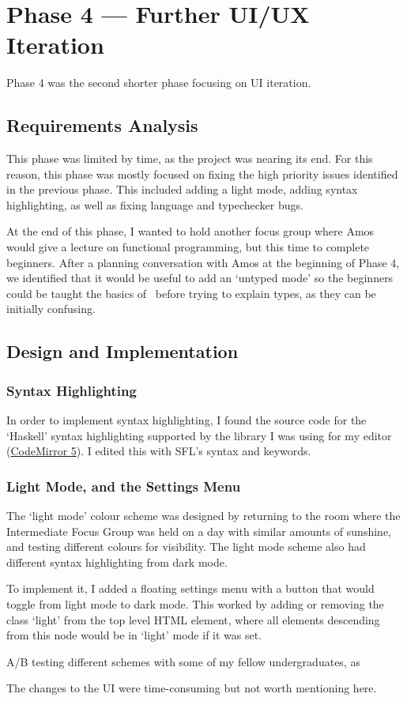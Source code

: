 \chapter{Phase 4 --- Further UI/UX Iteration}
Phase 4 was the second shorter phase focusing on UI iteration. 

\section{Requirements Analysis}
This phase was limited by time, as the project was nearing its end. For this reason, this phase was mostly focused on fixing the high priority issues identified in the previous phase. This included adding a light mode, adding syntax highlighting, as well as fixing language and typechecker bugs. 

At the end of this phase, I wanted to hold another focus group where Amos would give a lecture on functional programming, but this time to complete beginners. After a planning conversation with Amos at the beginning of Phase 4, we identified that it would be useful to add an `untyped mode' so the beginners could be taught the basics of \lcalc\ before trying to explain types, as they can be initially confusing. 

\section{Design and Implementation}
\subsection{Syntax Highlighting}
In order to implement syntax highlighting, I found the source code for the `Haskell' syntax highlighting supported by the library I was using for my editor (\href{https://codemirror.net/5/}{CodeMirror 5}). I edited this with SFL's syntax and keywords. 

\subsection{Light Mode, and the Settings Menu}
The `light mode' colour scheme was designed by returning to the room where the Intermediate Focus Group was held on a day with similar amounts of sunshine, and testing different colours for visibility. The light mode scheme also had different syntax highlighting from dark mode. 

To implement it, I added a floating settings menu with a button that would toggle from light mode to dark mode. This worked by adding or removing the class `light' from the top level HTML element, where all elements descending from this node would be in `light' mode if it was set. 

A/B testing different schemes with some of my fellow undergraduates, as 

The changes to the UI were time-consuming but not worth mentioning here. 